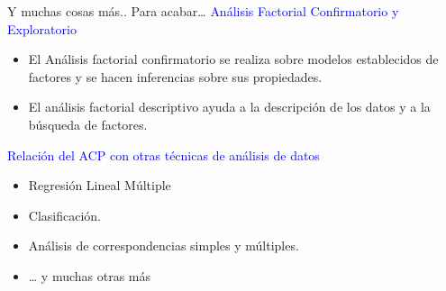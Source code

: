 \documentclass[
  spanish,
  ignorenonframetext,
]{beamer}
\providecommand{\tightlist}{%
  \setlength{\itemsep}{0pt}\setlength{\parskip}{0pt}}
\newcommand\blue[1]{\textcolor{blue}{#1}}
\begin{document}
\begin{frame}{Y muchas cosas más..}
\protect\hypertarget{y-muchas-cosas-muxe1s..-1}{}
Para acabar\ldots{}
\blue{Análisis Factorial Confirmatorio y  Exploratorio}

\begin{itemize}
\item
  El Análisis factorial confirmatorio se realiza sobre modelos
  establecidos de factores y se hacen inferencias sobre sus propiedades.
\item
  El análisis factorial descriptivo ayuda a la descripción de los datos
  y a la búsqueda de factores.
\end{itemize}

\blue{Relación del ACP con  otras técnicas de análisis de datos}

\begin{itemize}
\tightlist
\item
  Regresión Lineal Múltiple
\item
  Clasificación.
\item
  Análisis de correspondencias simples y múltiples.
\item
  \ldots{} y muchas otras más
\end{itemize}
\end{frame}
\end{document}
